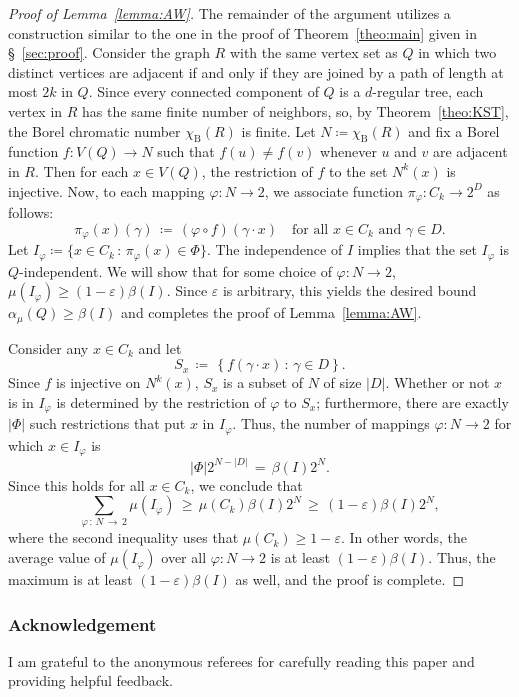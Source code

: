 \documentclass[AHL,Unicode,longabstracts,published]{cedram}
\newcommand{\0}{\varnothing}
\newcommand{\set}[1]{\{#1\}}
\renewcommand{\epsilon}{\varepsilon}
\renewcommand{\phi}{\varphi}
\renewcommand{\geq}{\geqslant}
\newcommand{\defeq}{\coloneqq}
\newcommand{\rmB}{\mathrm{B}}
\begin{document}
\begin{proof}[{Proof of Lemma~\ref{lemma:AW}}]
The remainder of the argument utilizes a construction similar to the one in the proof of Theorem~\ref{theo:main} given in \S~\ref{sec:proof}. Consider the graph $R$ with the same vertex set as $Q$ in which two distinct vertices are adjacent if and only if they are joined by a path of length at most $2k$ in $Q$. Since every connected component of $Q$ is a $d$-regular tree, each vertex in $R$ has the same finite number of neighbors, so, by Theorem~\ref{theo:KST}, the Borel chromatic number $\chi_\rmB(R)$ is finite. Let $N
\defeq \chi_\rmB(R)$ and fix a Borel function $f \colon V(Q) \to N$ such that $f(u) \neq f(v)$ whenever $u$ and $v$ are adjacent in $R$. Then for each $x \in V(Q)$, the restriction of $f$ to the set $N^k(x)$ is injective. Now, to each mapping $\phi \colon N \to 2$, we associate function $\pi_\phi \colon C_k \to 2^D$ as follows:
\[
\pi_\phi(x)(\gamma) \,
\defeq\, (\phi \circ f)(\gamma \cdot x) \quad \text{for all } x \in C_k \text{ and } \gamma \in D.
\]
Let $I_\phi
\defeq \set{x \in C_k \,:\, \pi_\phi(x) \in \Phi}$. The independence of $I$ implies that the set $I_\phi$ is $Q$-independent. We will show that for some choice of $\phi \colon N \to 2$, $\mu(I_\phi) \geq (1-\epsilon) \beta(I)$. Since $\epsilon$ is arbitrary, this yields the desired bound $\alpha_\mu(Q) \geq \beta(I)$ and completes the proof of Lemma~\ref{lemma:AW}.

Consider any $x \in C_k$ and let
\[
S_x \,
\defeq\, \left\{f(\gamma \cdot x) \,:\, \gamma \in D\right\}.
\]
Since $f$ is injective on $N^k(x)$, $S_x$ is a subset of $N$ of size $|D|$. Whether or not $x$ is in $I_\phi$ is determined by the restriction of $\phi$ to $S_x$; furthermore, there are exactly $|\Phi|$ such restrictions that put $x$ in $I_\phi$. Thus, the number of mappings $\phi \colon N \to 2$ for which $x \in I_\phi$ is
\[
|\Phi|2^{N - |D|} \,=\, \beta(I)2^N.
\]
Since this holds for all $x \in C_k$, we conclude that
\[
\sum_{\phi\,\colon\,N\,\to\,2} \mu(I_\phi) \,\geq\, \mu\left(C_k\right) \beta(I)2^N \,\geq\, (1-\epsilon)\beta(I)2^N,
\]
where the second inequality uses that $\mu(C_k) \geq 1 - \epsilon$. In other words, the average value of $\mu(I_\phi)$ over all $\phi \colon N \to 2$ is at least $(1-\epsilon) \beta(I)$. Thus, the maximum is at least $(1-\epsilon) \beta(I)$ as well, and the proof is complete.
\end{proof}

\subsubsection*{Acknowledgement}
I am grateful to the anonymous referees for carefully reading this paper and providing helpful feedback.




\end{document}
